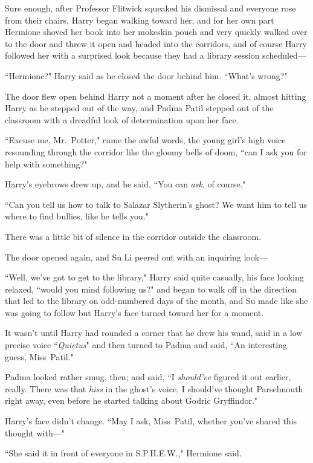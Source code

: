 Sure enough, after Professor Flitwick squeaked his dismissal and everyone rose from their chairs, Harry began walking toward her; and for her own part Hermione shoved her book into her mokeskin pouch and very quickly walked over to the door and threw it open and headed into the corridors, and of course Harry followed her with a surprised look because they had a library session scheduled—

``Hermione?" Harry said as he closed the door behind him. ``What's wrong?"

The door flew open behind Harry not a moment after he closed it, almost hitting Harry as he stepped out of the way, and Padma Patil stepped out of the classroom with a dreadful look of determination upon her face.

``Excuse me, Mr.~Potter," came the awful words, the young girl's high voice resounding through the corridor like the gloomy bells of doom, ``can I ask you for help with something?"

Harry's eyebrows drew up, and he said, ``You can \emph{ask}, of course."

``Can you tell us how to talk to Salazar Slytherin's ghost? We want him to tell us where to find bullies, like he tells you."

There was a little bit of silence in the corridor outside the classroom.

The door opened again, and Su Li peered out with an inquiring look—

``Well, we've got to get to the library," Harry said quite casually, his face looking relaxed, ``would you mind following us?" and began to walk off in the direction that led to the library on odd-numbered days of the month, and Su made like she was going to follow but Harry's face turned toward her for a moment.

It wasn't until Harry had rounded a corner that he drew his wand, said in a low precise voice ``\emph{Quietus}" and then turned to Padma and said, ``An interesting guess, Miss~Patil."

Padma looked rather smug, then; and said, ``I \emph{should've} figured it out earlier, really. There was that \emph{hiss} in the ghost's voice, I should've thought Parselmouth right away, even before he started talking about Godric Gryffindor."

Harry's face didn't change. ``May I ask, Miss~Patil, whether you've shared this thought with—"

``She said it in front of everyone in S.P.H.E.W.," Hermione said.

